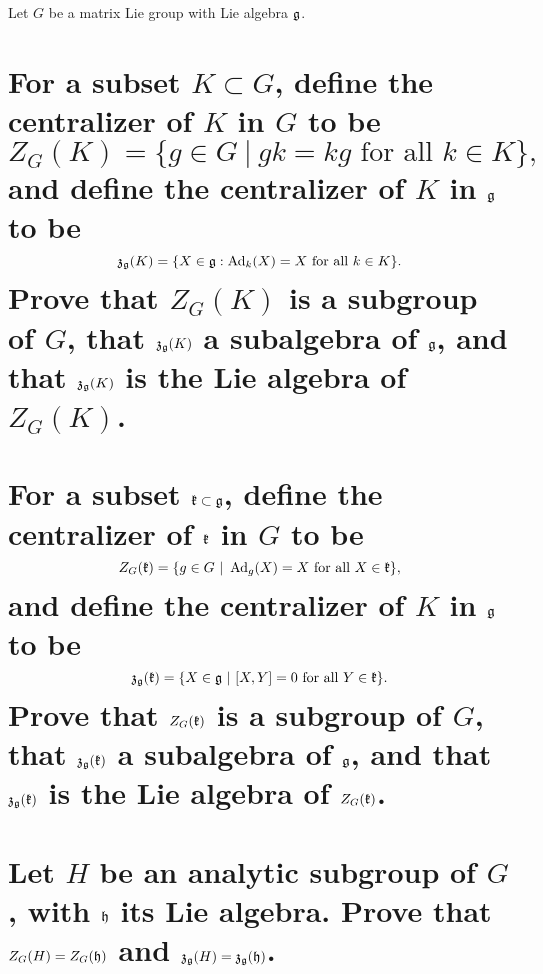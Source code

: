 \documentclass[
	pages,
	boxes,
	color=WildStrawberry
]{homework}
\begin{document}
\begin{problem}
Let $G$ be a matrix Lie group with Lie algebra $\mathfrak{g}$.
\begin{parts}
	\part{For a subset $K \subset G$, define the centralizer of $K$ in $G$ to be
	\[
		Z_G(K) = \{ g \in G\ |\ gk = kg \text{ for all }k \in K \},
	\]
	and define the centralizer of $K$ in $\mathfrak{g}$ to be
	\[
		\mathfrak{z}_{\mathfrak{g}}(K) = \{ X \in \mathfrak{g} : \operatorname{Ad}_k(X) = X \text{ for all } k \in K \}.
	\]
	Prove that $Z_G(K)$ is a subgroup of $G$, that $\mathfrak{z}_{\mathfrak{g}}(K)$ a subalgebra of $\mathfrak{g}$, and that $\mathfrak{z}_{\mathfrak{g}}(K)$ is the Lie algebra of $Z_G(K)$.}\label{part:9a}
	\part{For a subset $\mathfrak{k} \subset \mathfrak{g}$, define the centralizer of $\mathfrak{k}$ in $G$ to be
	\[
		Z_G(\mfr{k}) = \{ g \in G\ |\ \Ad_g(X) = X\text{ for all }X \in \mfr{k} \},
	\]
	and define the centralizer of $K$ in $\mathfrak{g}$ to be
	\[
		\mfr{z}_{\mfr{g}}(\mfr{k}) = \{ X \in \mfr{g}\ |\ [X, Y] = 0 \text{ for all }Y \in \mfr{k} \}.
	\]
	Prove that $Z_G(\mathfrak{k})$ is a subgroup of $G$, that $\mathfrak{z}_{\mathfrak{g}}(\mathfrak{k})$ a subalgebra of $\mathfrak{g}$, and that $\mathfrak{z}_{\mathfrak{g}}(\mathfrak{k})$ is the Lie algebra of $Z_G(\mathfrak{k})$.}\label{part:9b}
	\part{Let $H$ be an analytic subgroup of $G$, with $\mathfrak{h}$ its Lie algebra. Prove that $Z_G(H) = Z_G(\mathfrak{h})$ and $\mathfrak{z}_{\mathfrak{g}}(H) = \mathfrak{z}_{\mathfrak{g}}(\mathfrak{h})$.}\label{part:9c}
\end{parts}
\end{problem}
\end{document}
